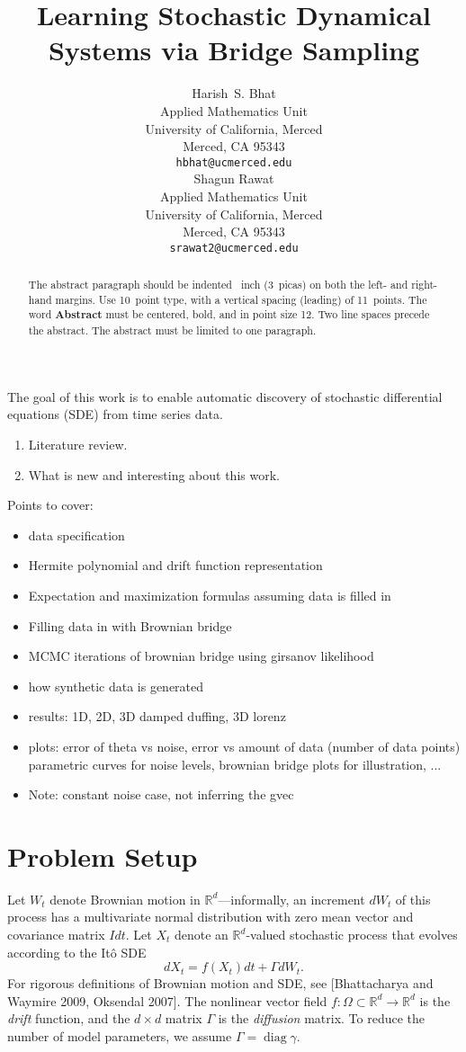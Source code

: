 \documentclass{article}
\title{Learning Stochastic Dynamical Systems via Bridge Sampling}
\author{
 Harish~S. Bhat\\
 Applied Mathematics Unit\\
 University of California, Merced\\
 Merced, CA 95343\\
 \texttt{hbhat@ucmerced.edu} \\
 \And
 Shagun Rawat\\
 Applied Mathematics Unit\\
 University of California, Merced\\
 Merced, CA 95343\\
 \texttt{srawat2@ucmerced.edu}
}
\newcommand{\opdiag}{\ensuremath{\operatorname{diag}}}
\begin{document}
\maketitle

\begin{abstract}
  The abstract paragraph should be indented ~inch
  (3~picas) on both the left- and right-hand margins. Use 10~point
  type, with a vertical spacing (leading) of 11~points.  The word
  \textbf{Abstract} must be centered, bold, and in point size 12. Two
  line spaces precede the abstract. The abstract must be limited to
  one paragraph.
\end{abstract}

The goal of this work is to enable automatic discovery of stochastic differential equations (SDE) from time series data.  

\begin{enumerate}
\item Literature review.
\item What is new and interesting about this work.
\end{enumerate}

Points to cover:
\begin{itemize}
\item data specification
\item Hermite polynomial and drift function representation
\item Expectation and maximization formulas assuming data is filled in
\item Filling data in with Brownian bridge
\item MCMC iterations of brownian bridge using girsanov likelihood
\item how synthetic data is generated
\item results: 1D, 2D, 3D damped duffing, 3D lorenz
\item plots: error of theta vs noise, error vs amount of data (number of data points) parametric curves for noise levels, brownian bridge plots for illustration, ...
\item Note: constant noise case, not inferring the gvec
\end{itemize}

\section{Problem Setup}
Let $W_t$ denote Brownian motion in $\mathbb{R}^d$---informally, an increment $dW_t$ of this process has a multivariate normal distribution with zero mean vector and covariance matrix $I dt$.  Let $X_t$ denote an $\mathbb{R}^d$-valued stochastic process that evolves according to the It\^{o} SDE
\begin{equation} \label{eqn:sde}
d X_t = f( X_t) dt + \Gamma d W_t.
\end{equation}
For rigorous definitions of Brownian motion and SDE, see [Bhattacharya and Waymire 2009, Oksendal 2007].
The nonlinear vector field $f : \Omega \subset \mathbb{R}^d \to \mathbb{R}^d$ is the \emph{drift} function, and the $d \times d$ matrix $\Gamma$ is the \emph{diffusion} matrix.  To reduce the number of model parameters, we assume $\Gamma = \opdiag \gamma$.
\end{document}
